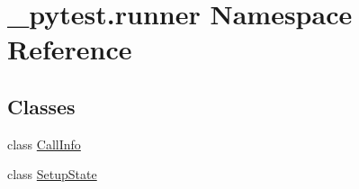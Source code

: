 \hypertarget{namespace__pytest_1_1runner}{}\section{\+\_\+pytest.\+runner Namespace Reference}
\label{namespace__pytest_1_1runner}
\subsection*{Classes}
\begin{DoxyCompactItemize}
\item 
class \hyperlink{class__pytest_1_1runner_1_1_call_info}{Call\+Info}
\item 
class \hyperlink{class__pytest_1_1runner_1_1_setup_state}{Setup\+State}
\end{DoxyCompactItemize}
